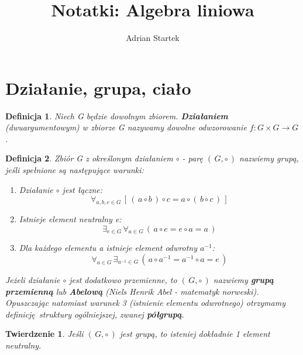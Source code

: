 \documentclass{article}
\title{Notatki: Algebra liniowa}
\author{Adrian Startek}
\newtheorem{definition}{Definicja}[section]
\newtheorem{theorem}{Twierdzenie}[section]
\begin{document}
    \maketitle
    \newpage

    \section{Działanie, grupa, ciało}
    \begin{definition}
        Niech G będzie dowolnym zbiorem. \textbf{Działaniem} (dwuargumentowym) w zbiorze G nazywamy dowolne odwzorowanie $f: G \times G \rightarrow G$.
    \end{definition}

    \begin{definition}
        Zbiór G z określonym działaniem $\circ$ - parę $(\,G, \circ\,)$ nazwiemy grupą, jeśli spełnione są następujące warunki:
        \begin{enumerate}
            \item Działanie $\circ$ jest łączne: 
                \begin{equation*}
                    \forall_{a,b,c \in G} \, [\,(\,a \circ b\,) \circ c = a \circ (\,b \circ c\,)\,]
                \end{equation*}
            \item Istnieje element neutralny e:
                \begin{equation*}
                    \exists_{e \in G} \, \forall_{a \in G} \, (\,a \circ e = e \circ a = a\,)
                \end{equation*}
            \item Dla każdego elementu a istnieje element odwrotny $a^{-1}$:
                \begin{equation*}
                    \forall_{a \in G} \, \exists_{a^{-1} \in G} \, (\,a \circ a^{-1} = a^{-1} \circ a = e\,)
                \end{equation*}
        \end{enumerate}
        Jeżeli działanie $\circ$ jest dodatkowo przemienne, to $(\, G, \circ\,)$ nazwiemy \textbf{grupą przemienną} lub \textbf{Abelową} (Niels Henrik Abel - matematyk norweski). Opuszczając natomiast warunek 3 (istnienie elementu odwrotnego) otrzymamy definicję struktury ogólniejszej, zwanej \textbf{półgrupą}. 
    \end{definition}

    \begin{theorem}
        Jeśli $(\,G, \circ \,)$ jest grupą, to isteniej dokładnie 1 element neutralny.
    \end{theorem}
\end{document}
